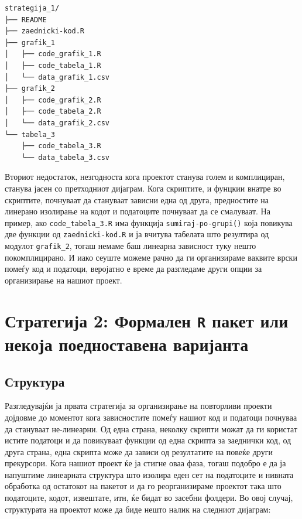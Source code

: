 \documentclass[
]{book}
\begin{document}
\begin{verbatim}
strategija_1/
├── README
├── zaednicki-kod.R
├── grafik_1
│   ├── code_grafik_1.R
│   ├── code_tabela_1.R
│   └── data_grafik_1.csv
├── grafik_2
│   ├── code_grafik_2.R
│   ├── code_tabela_2.R
│   └── data_grafik_2.csv
└── tabela_3
    ├── code_tabela_3.R
    └── data_tabela_3.csv
\end{verbatim}

Вториот недостаток, незгодноста кога проектот станува голем и комплициран, станува јасен со претходниот дијаграм. Кога скриптите, и фунцкии внатре во скриптите, почнуваат да стануваат зависни една од друга, предностите на линерано изолирање на кодот и податоците почнуваат да се смалуваат. На пример, ако \texttt{code\_tabela\_3.R} има функција \texttt{sumiraj-po-grupi()} која повикува две функции од \texttt{zaednicki-kod.R} и ја вчитува табелата што резултира од модулот \texttt{grafik\_2}, тогаш немаме баш линеарна зависност туку нешто покомплицирано. И иако сеуште можеме рачно да ги организираме ваквите врски помеѓу код и податоци, веројатно е време да разгледаме други опции за организирање на нашиот проект.

\hypertarget{ux441ux442ux440ux430ux442ux435ux433ux438ux458ux430-2-ux444ux43eux440ux43cux430ux43bux435ux43d-r-ux43fux430ux43aux435ux442-ux438ux43bux438-ux43dux435ux43aux43eux458ux430-ux43fux43eux435ux434ux43dux43eux441ux442ux430ux432ux435ux43dux430-ux432ux430ux440ux438ux458ux430ux43dux442ux430}{%
\section{\texorpdfstring{Стратегија 2: Формален \texttt{R} пакет или некоја поедноставена варијанта}{Стратегија 2: Формален R пакет или некоја поедноставена варијанта}}\label{ux441ux442ux440ux430ux442ux435ux433ux438ux458ux430-2-ux444ux43eux440ux43cux430ux43bux435ux43d-r-ux43fux430ux43aux435ux442-ux438ux43bux438-ux43dux435ux43aux43eux458ux430-ux43fux43eux435ux434ux43dux43eux441ux442ux430ux432ux435ux43dux430-ux432ux430ux440ux438ux458ux430ux43dux442ux430}}

\hypertarget{ux441ux442ux440ux443ux43aux442ux443ux440ux430-1}{%
\subsection{Структура}\label{ux441ux442ux440ux443ux43aux442ux443ux440ux430-1}}

Разгледувајќи ја првата стратегија за организирање на повторливи проекти дојдовме до моментот кога зависностите помеѓу нашиот код и податоци почнуваа да стануваат не-линеарни. Од една страна, неколку скрипти можат да ги користат истите податоци и да повикуваат функции од една скрипта за заеднички код, од друга страна, една скрипта може да зависи од резултатите на повеќе други прекурсори. Кога нашиот проект ќе ја стигне оваа фаза, тогаш подобро е да ја напуштиме линеарната структура што изолира еден сет на податоците и нивната обработка од остатокот на пакетот и да го реорганизираме проектот така што податоците, кодот, извештате, итн, ќе бидат во засебни фолдери. Во овој случај, структурата на проектот може да биде нешто налик на следниот дијаграм:
\end{document}

